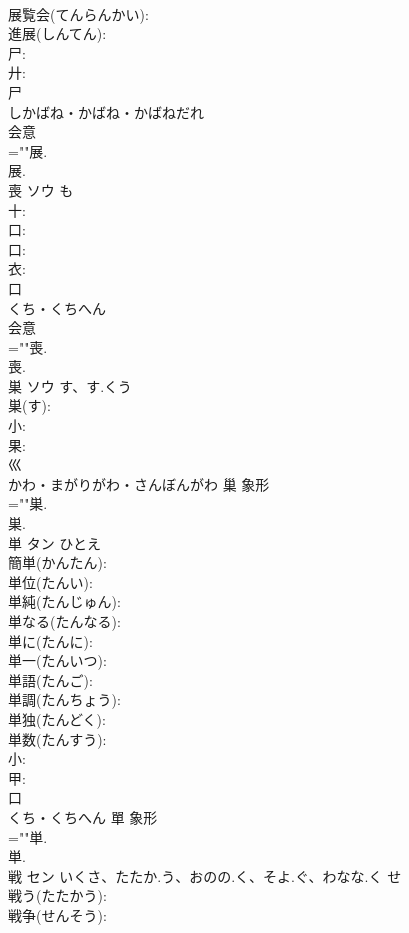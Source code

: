 \documentclass[8pt]{extreport}
\begin{document}
\begin{CJK}{UTF8}{min}
\\	展覧会(てんらんかい): 
\\	進展(しんてん): 
\\	尸: 
\\	廾: 
\\	尸	
\\	しかばね・かばね・かばねだれ	
\\	会意 
\\	=""展.
\\	展.
\\	喪	ソウ	も		
\\	十: 
\\	口: 
\\	口: 
\\	衣: 
\\	口	
\\	くち・くちへん	
\\	会意 
\\	=""喪.
\\	喪.
\\	巣	ソウ	す、す.くう		
\\	巣(す): 
\\	小: 
\\	果: 
\\	巛	
\\	かわ・まがりがわ・さんぼんがわ	巢	象形 
\\	=""巣.
\\	巣.
\\	単	タン	ひとえ		
\\	簡単(かんたん): 
\\	単位(たんい): 
\\	単純(たんじゅん): 
\\	単なる(たんなる): 
\\	単に(たんに): 
\\	単一(たんいつ): 
\\	単語(たんご): 
\\	単調(たんちょう): 
\\	単独(たんどく): 
\\	単数(たんすう): 
\\	小: 
\\	甲: 
\\	口	
\\	くち・くちへん	單	象形 
\\	=""単.
\\	単.
\\	戦	セン	いくさ、たたか.う、おのの.く、そよ.ぐ、わなな.く	せ	
\\	戦う(たたかう): 
\\	戦争(せんそう): 

\end{CJK}
\end{document}
